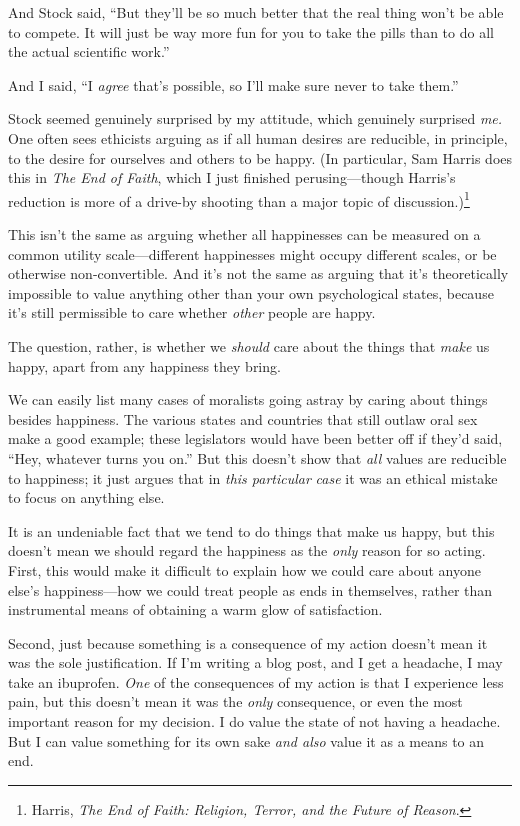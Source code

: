  And Stock said, ``But they'll be
so much better that the real thing won't be able to
compete. It will just be way more fun for you to take the pills than to
do all the actual scientific work.''


 And I said, ``I \textit{agree}
that's possible, so I'll make sure
never to take them.''

{
 Stock seemed genuinely surprised by my attitude, which genuinely
surprised \textit{me.} One often sees ethicists arguing as if all human
desires are reducible, in principle, to the desire for ourselves and
others to be happy. (In particular, Sam Harris does this in \textit{The
End of Faith}, which I just finished perusing---though
Harris's reduction is more of a drive-by shooting than
a major topic of discussion.)\footnote{Harris, \textit{The End of Faith: Religion, Terror, and the
Future of Reason}.}}


 This isn't the same as arguing whether all
happinesses can be measured on a common utility scale---different
happinesses might occupy different scales, or be otherwise
non-convertible. And it's not the same as arguing that
it's theoretically impossible to value anything other
than your own psychological states, because it's still
permissible to care whether \textit{other} people are happy.


 The question, rather, is whether we \textit{should} care about the
things that \textit{make} us happy, apart from any happiness they
bring.


 We can easily list many cases of moralists going astray by caring
about things besides happiness. The various states and countries that
still outlaw oral sex make a good example; these legislators would have
been better off if they'd said, ``Hey,
whatever turns you on.'' But this
doesn't show that \textit{all} values are reducible to
happiness; it just argues that in \textit{this particular}
\textit{case} it was an ethical mistake to focus on anything else.


 It is an undeniable fact that we tend to do things that make us
happy, but this doesn't mean we should regard the
happiness as the \textit{only} reason for so acting. First, this would
make it difficult to explain how we could care about anyone
else's happiness---how we could treat people as ends in
themselves, rather than instrumental means of obtaining a warm glow of
satisfaction.


 Second, just because something is a consequence of my action
doesn't mean it was the sole justification. If
I'm writing a blog post, and I get a headache, I may
take an ibuprofen. \textit{One} of the consequences of my action is
that I experience less pain, but this doesn't mean it
was the \textit{only} consequence, or even the most important reason
for my decision. I do value the state of not having a headache. But I
can value something for its own sake \textit{and also} value it as a
means to an end.


